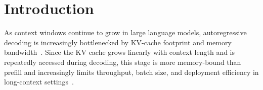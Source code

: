 \documentclass[runningheads]{llncs}
\newcommand{\method}{JSQKV}
\newcommand{\paperavailability}{Code repository omitted for double-blind review.}
\newcommand{\paperavailability}{Code is available at \url{https://github.com/Haozon/JSQKV}.}
\begin{document}
\begin{abstract}
Experimental results show that, under matched compression budgets, \method\ generally outperforms the sequential MUSTAFAR+KIVI baseline on representative LongBench tasks, with larger gains under more aggressive sparse-quant settings. On Llama-3-8B-Instruct, \method\ improves the average score on six representative LongBench tasks from 39.83 to 43.12, while also improving end-to-end throughput by 44.2\% over dense decoding and increasing the KV-cache compression ratio to 3.48$\times$.

\end{abstract}

\section{Introduction}
\label{sec:intro}

As context windows continue to grow in large language models, autoregressive decoding is increasingly bottlenecked by KV-cache footprint and memory bandwidth~\cite{ding2024longrope}. Since the KV cache grows linearly with context length and is repeatedly accessed during decoding, this stage is more memory-bound than prefill and increasingly limits throughput, batch size, and deployment efficiency in long-context settings~\cite{kwon2023pagedattention,agrawal2024sarathiserve}.
\end{document}
